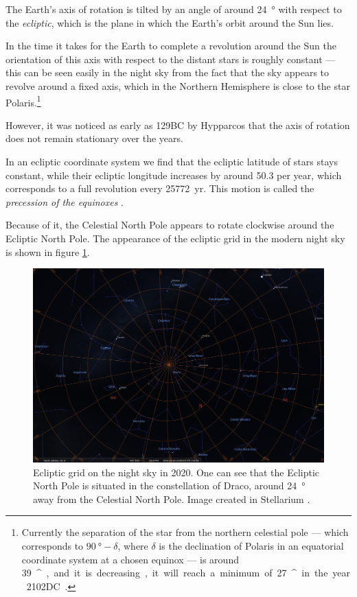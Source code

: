 \documentclass[main.tex]{subfiles}
\begin{document}
The Earth's axis of rotation is tilted by an angle of around \SI{24}{\degree} with respect to the \emph{ecliptic}, which is the plane in which the Earth's orbit around the Sun lies. 

In the time it takes for the Earth to complete a revolution around the Sun the orientation of this axis with respect to the distant stars is roughly constant --- this can be seen easily in the night sky from the fact that the sky appears to revolve around a fixed axis, which in the Northern Hemisphere is close to the star Polaris.\footnote{Currently the separation of the star from the northern celestial pole --- which corresponds to \(\SI{90}{\degree} - \delta \), where \(\delta \) is the declination of Polaris in an equatorial coordinate system at a chosen equinox --- is around \SI{39}{^\prime}, and it is decreasing, it will reach a minimum of \SI{27}{^\prime} in the year 2102DC \cite[pag.\ 58]{barbieriLezioniDiAstronomia2003}.}

However, it was noticed as early as 129BC by Hypparcos that the axis of rotation does not remain stationary over the years. 

In an ecliptic coordinate system we find that the ecliptic latitude of stars stays constant, while their ecliptic longitude increases by around \SI{50.3}{\arcsec} per year, which corresponds to a full revolution every \SI{25772}{yr}.
This motion is called the \emph{precession of the equinoxes}
\cite[]{barbieriLezioniDiAstronomia2003}. 

Because of it, the Celestial North Pole appears to rotate clockwise around the Ecliptic North Pole. The appearance of the ecliptic grid in the modern night sky is shown in figure \ref{fig:ecliptic-grid}. 

\begin{figure}[ht]
\centering
\includegraphics[width=\textwidth]{figures/ecliptic_grid_athens_now.png}
\caption{Ecliptic grid on the night sky in 2020. One can see that the Ecliptic North Pole is situated in the constellation of Draco, around \SI{24}{\degree} away from the Celestial North Pole. Image created in Stellarium \cite[]{stellariumcontributorsStellariumAstronomySoftware2020}.}
\label{fig:ecliptic-grid}
\end{figure}
\end{document}
